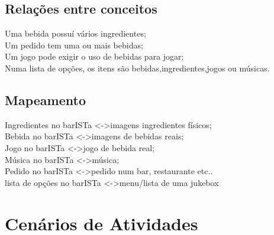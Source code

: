 \documentclass{article}
\begin{document}
\subsection*{Relações entre conceitos}
Uma bebida possuí vários ingredientes;\\
Um pedido tem uma ou mais bebidas;\\
Um jogo pode exigir o uso de bebidas para jogar;\\
Numa lista de opções, os itens são bebidas,ingredientes,jogos ou músicas.\\



\subsection*{Mapeamento}
Ingredientes no barISTa \textless -\textgreater imagens ingredientes físicos;\\
Bebida no barISTa \textless -\textgreater   imagens de bebidas reais;\\
Jogo no barISTa \textless -\textgreater  jogo de bebida real;\\
Música no barISTa \textless -\textgreater  música; \\
Pedido no barISTa \textless -\textgreater  pedido num bar, restaurante etc..\\
lista de opções no barISTa \textless -\textgreater menu/lista de uma jukebox \\


\section*{Cenários de Atividades}
\end{document}
